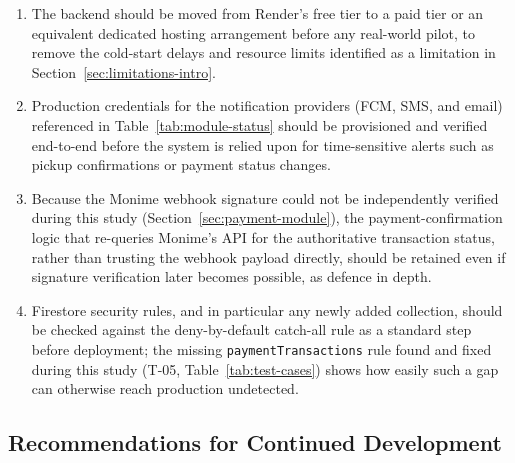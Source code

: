 \begin{enumerate}[leftmargin=1.4cm]
  \item The backend should be moved from Render's free tier to a paid tier
    or an equivalent dedicated hosting arrangement before any real-world
    pilot, to remove the cold-start delays and resource limits identified
    as a limitation in Section~\ref{sec:limitations-intro}.
  \item Production credentials for the notification providers (FCM, SMS,
    and email) referenced in Table~\ref{tab:module-status} should be
    provisioned and verified end-to-end before the system is relied upon
    for time-sensitive alerts such as pickup confirmations or payment
    status changes.
  \item Because the Monime webhook signature could not be independently
    verified during this study (Section~\ref{sec:payment-module}), the
    payment-confirmation logic that re-queries Monime's API for the
    authoritative transaction status, rather than trusting the webhook
    payload directly, should be retained even if signature verification
    later becomes possible, as defence in depth.
  \item Firestore security rules, and in particular any newly added
    collection, should be checked against the deny-by-default catch-all
    rule as a standard step before deployment; the missing
    \texttt{paymentTransactions} rule found and fixed during this study
    (T-05, Table~\ref{tab:test-cases}) shows how easily such a gap can
    otherwise reach production undetected.
\end{enumerate}

\subsection{Recommendations for Continued Development}


